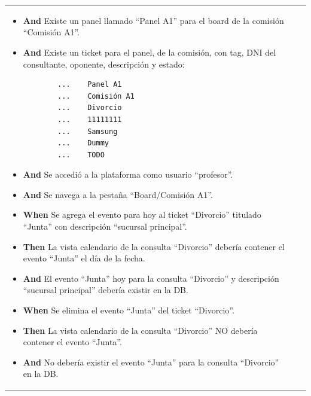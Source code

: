 \begin{longtable}{|p{1cm}|p{2.5cm}|p{12cm}|}
\begin{itemize}
        \item \textbf{And} Existe un panel llamado ``Panel A1'' para el board de la comisión ``Comisión A1''.
        \item \textbf{And} Existe un ticket para el panel, de la comisión, con tag, DNI del consultante, oponente, descripción y estado:
        \begin{verbatim}
        ...    Panel A1
        ...    Comisión A1
        ...    Divorcio
        ...    11111111
        ...    Samsung
        ...    Dummy
        ...    TODO
        \end{verbatim}
        \item \textbf{And} Se accedió a la plataforma como usuario ``profesor''.
        \item \textbf{And} Se navega a la pestaña ``Board/Comisión A1''.
        \newline
    
        \item \textbf{When} Se agrega el evento para hoy al ticket ``Divorcio'' titulado ``Junta'' con descripción ``sucursal principal''.
        \newline
    
        \item \textbf{Then} La vista calendario de la consulta ``Divorcio'' debería contener el evento ``Junta'' el día de la fecha.
        \item \textbf{And} El evento ``Junta'' hoy para la consulta ``Divorcio'' y descripción ``sucursal principal'' debería existir en la DB.
        \newline

        \item \textbf{When} Se elimina el evento ``Junta'' del ticket ``Divorcio''.
        \newline
        
        \item \textbf{Then} La vista calendario de la consulta ``Divorcio'' NO debería contener el evento ``Junta''.
        \item \textbf{And} No debería existir el evento ``Junta'' para la consulta ``Divorcio'' en la DB.


\end{itemize}
\end{longtable}
